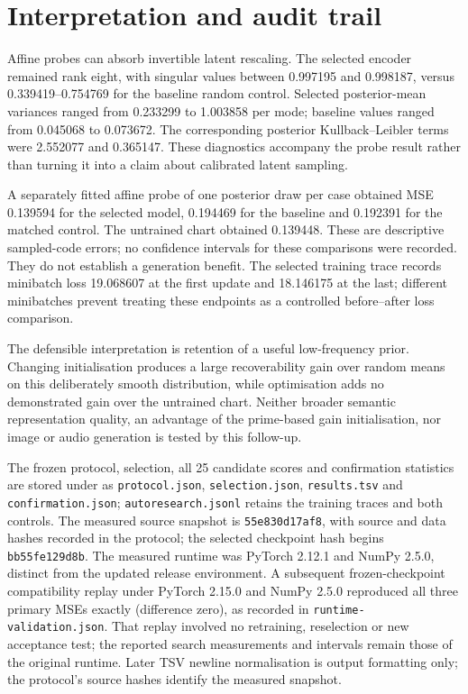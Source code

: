 \documentclass[11pt,a4paper]{article}
\begin{document}
\section{Interpretation and audit trail}
Affine probes can absorb invertible latent rescaling. The selected
encoder remained rank eight, with singular values between 0.997195 and
0.998187, versus 0.339419--0.754769 for the baseline random control.
Selected posterior-mean variances ranged from 0.233299 to 1.003858 per
mode; baseline values ranged from 0.045068 to 0.073672. The corresponding
posterior Kullback--Leibler terms were 2.552077 and 0.365147. These
diagnostics accompany the probe result rather than turning it into a
claim about calibrated latent sampling.

A separately fitted affine probe of one posterior draw per case obtained
MSE 0.139594 for the selected model, 0.194469 for the baseline and 0.192391
for the matched control. The untrained chart obtained 0.139448. These are
descriptive sampled-code errors; no confidence intervals for these
comparisons were recorded. They do not establish a generation benefit.
The selected training trace records minibatch loss 19.068607 at the first
update and 18.146175 at the last; different minibatches prevent treating
these endpoints as a controlled before--after loss comparison.

The defensible interpretation is retention of a useful low-frequency
prior. Changing initialisation produces a large recoverability gain over
random means on this deliberately smooth distribution, while optimisation
adds no demonstrated gain over the untrained chart. Neither broader
semantic representation quality, an advantage of the prime-based gain
initialisation, nor image or audio generation is tested by this follow-up.

The frozen protocol, selection, all 25 candidate scores and confirmation
statistics are stored under
 as
\texttt{protocol.json}, \texttt{selection.json}, \texttt{results.tsv} and
\texttt{confirmation.json}; \texttt{autoresearch.jsonl} retains the
training traces and both controls. The measured source snapshot is
\texttt{55e830d17af8}, with source and data hashes recorded in the protocol;
the selected checkpoint hash begins \texttt{bb55fe129d8b}. The measured
runtime was PyTorch 2.12.1 and NumPy 2.5.0, distinct from the updated release
environment. A subsequent frozen-checkpoint compatibility replay under
PyTorch 2.15.0 and NumPy 2.5.0 reproduced all three primary MSEs exactly
(difference zero), as recorded in \texttt{runtime-validation.json}.
That replay involved no retraining, reselection or new acceptance test;
the reported search measurements and intervals remain those of the original
runtime. Later TSV newline normalisation is output formatting only; the
protocol's source hashes identify the measured snapshot.
\end{document}
